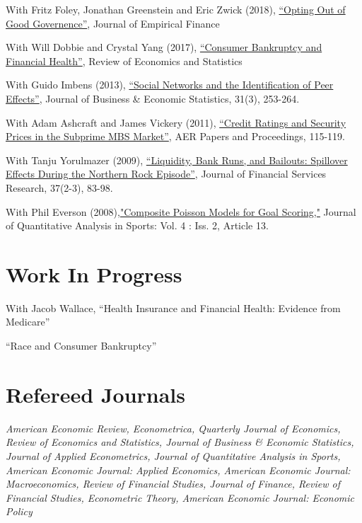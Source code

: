 \documentclass[letterpaper]{article}
\renewenvironment{itemize}{
  \begin{list}{}
    { \setlength{\itemsep}{5pt}
      \setlength{\parsep}{0pt}
      \setlength{\topsep}{0pt}
      \setlength{\leftmargin}{0em} } }{
  \end{list}}
\begin{document}
\begin{itemize}
\item With Fritz Foley, Jonathan Greenstein and Eric Zwick (2018), \href{http://www.nber.org/papers/w19953}{``Opting Out of Good Governence''}, Journal of Empirical Finance
\item With Will Dobbie and Crystal Yang (2017), \href{http://www.nber.org/papers/w21032}{``Consumer Bankruptcy and Financial Health''}, Review of Economics and Statistics
\item With Guido Imbens (2013), \href{http://www.tandfonline.com/doi/pdf/10.1080/07350015.2013.801251}{``Social Networks and the Identification of Peer Effects''}, Journal of Business \& Economic Statistics, 31(3), 253-264.
\item With Adam Ashcraft and James Vickery (2011), \href{http://papers.ssrn.com.ezp-prod1.hul.harvard.edu/sol3/papers.cfm?abstract_id=1856823}{``Credit Ratings
    and Security Prices in the Subprime MBS Market''}, AER Papers and Proceedings,  115-119. 
\item With Tanju Yorulmazer (2009), \href{http://www.springerlink.com/content/ww187761jgr660q5/}{``Liquidity, Bank Runs, and Bailouts: Spillover Effects During the Northern Rock Episode''}, Journal of Financial Services Research, 37(2-3), 83-98. 
\item With Phil Everson (2008),\href{http://www.bepress.com/jqas/vol4/iss2/13/}{"Composite Poisson Models for Goal Scoring,"} Journal of Quantitative Analysis in Sports: Vol. 4 : Iss. 2, Article 13.
\end{itemize}


\section*{Work In Progress}
\begin{itemize}
\item With Jacob Wallace, ``Health Insurance and Financial Health: Evidence from Medicare''
\item ``Race and Consumer Bankruptcy'' 
\end{itemize}


\section*{Refereed Journals}
\textit{American Economic Review, Econometrica, Quarterly Journal of Economics, Review of Economics and Statistics, Journal of Business \& Economic Statistics, Journal of Applied Econometrics, Journal of Quantitative Analysis in Sports, American Economic Journal: Applied Economics, American Economic Journal: Macroeconomics, Review of Financial Studies, Journal of Finance, Review of Financial Studies, Econometric Theory, American Economic Journal: Economic Policy}
\end{document}
